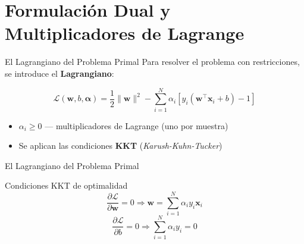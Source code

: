 \documentclass[aspectratio=169,xcolor=dvipsnames]{beamer}
\begin{document}
\section{Formulación Dual y Multiplicadores de Lagrange}

\begin{frame}{El Lagrangiano del Problema Primal}
    Para resolver el problema con restricciones, se introduce el \textbf{Lagrangiano}:

    \begin{equation}
        \mathcal{L}(\mathbf{w}, b, \boldsymbol{\alpha}) = \frac{1}{2}\|\mathbf{w}\|^2 - \sum_{i=1}^{N} \alpha_i \left[ y_i(\mathbf{w}^\top \mathbf{x}_i + b) - 1 \right]
    \end{equation}

    \begin{itemize}
        \item $\alpha_i \geq 0$ — multiplicadores de Lagrange (uno por muestra)
        \item Se aplican las condiciones \textbf{KKT} (\textit{Karush-Kuhn-Tucker})
    \end{itemize}
\end{frame}
\begin{frame}{El Lagrangiano del Problema Primal}
    \begin{block}{Condiciones KKT de optimalidad}
        \begin{equation}
            \frac{\partial \mathcal{L}}{\partial \mathbf{w}} = 0 \Rightarrow \mathbf{w} = \sum_{i=1}^{N} \alpha_i y_i \mathbf{x}_i
        \end{equation}
        \begin{equation}
            \frac{\partial \mathcal{L}}{\partial b} = 0 \Rightarrow \sum_{i=1}^{N} \alpha_i y_i = 0
        \end{equation}
    \end{block}
\end{frame}
\end{document}
